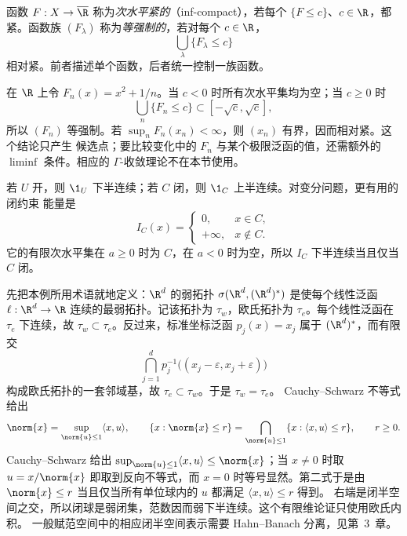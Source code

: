 \begin{definition}[次水平紧与等强制]\label{def:1-2-3-3}
函数 \(F:X\to\overline\R\) 称为\emph{次水平紧的}（inf-compact），若每个
\(\{F\le c\}\)、\(c\in\R\)，都紧。函数族 \((F_\lambda)\) 称为\emph{等强制的}，若对每个 \(c\in\R\)，
\[
 \bigcup_\lambda\{F_\lambda\le c\}
\]
相对紧。前者描述单个函数，后者统一控制一族函数。
\end{definition}

\begin{example}[可计算的等强制族]\label{ex:1-2-3-equicoercive}
在 \(\R\) 上令 \(F_n(x)=x^2+1/n\)。当 \(c<0\) 时所有次水平集均为空；当 \(c\ge0\) 时
\[
 \bigcup_n\{F_n\le c\}\subset[-\sqrt c,\sqrt c],
\]
所以 \((F_n)\) 等强制。若 \(\sup_nF_n(x_n)<\infty\)，则 \((x_n)\) 有界，因而相对紧。这个结论只产生
候选点；要比较变化中的 \(F_n\) 与某个极限泛函的值，还需额外的 \(\liminf\) 条件。相应的
\(\Gamma\)-收敛理论不在本节使用。
\end{example}

\begin{example}[开集指标与闭约束]\label{ex:1-2-3-1}
若 \(U\) 开，则 \(\1_U\) 下半连续；若 \(C\) 闭，则 \(\1_C\) 上半连续。对变分问题，更有用的闭约束
能量是
\[
 I_C(x)=
 \begin{cases}
  0,&x\in C,\\
  +\infty,&x\notin C.
 \end{cases}
\]
它的有限次水平集在 \(a\ge0\) 时为 \(C\)，在 \(a<0\) 时为空，所以 \(I_C\) 下半连续当且仅当 \(C\) 闭。
\end{example}

\begin{example}[有限维模型中的弱下半连续性]\label{ex:1-2-3-2}
先把本例所用术语就地定义：\(\R^d\) 的弱拓扑
\(\sigma(\R^d,(\R^d)^*)\) 是使每个线性泛函 \(\ell:\R^d\to\R\) 连续的最弱拓扑。记该拓扑为
\(\tau_w\)，欧氏拓扑为 \(\tau_e\)。每个线性泛函在 \(\tau_e\) 下连续，故
\(\tau_w\subset\tau_e\)。反过来，标准坐标泛函 \(p_j(x)=x_j\) 属于 \((\R^d)^*\)，而有限交
\[
 \bigcap_{j=1}^d p_j^{-1}\bigl((x_j-\varepsilon,x_j+\varepsilon)\bigr)
\]
构成欧氏拓扑的一套邻域基，故 \(\tau_e\subset\tau_w\)。于是 \(\tau_w=\tau_e\)。
Cauchy--Schwarz 不等式给出
\[
  \norm{x}=\sup_{\norm{u}\le1}\langle x,u\rangle,\qquad
  \{x:\norm{x}\le r\}
  =\bigcap_{\norm{u}\le1}\{x:\langle x,u\rangle\le r\},\qquad r\ge0.
\]
Cauchy--Schwarz 给出
\(\sup_{\norm{u}\le1}\langle x,u\rangle\le\norm{x}\)；当 \(x\ne0\) 时取
\(u=x/\norm{x}\) 即取到反向不等式，而 \(x=0\) 时等号显然。第二式于是由
\(\norm{x}\le r\) 当且仅当所有单位球内的 \(u\) 都满足
\(\langle x,u\rangle\le r\) 得到。
右端是闭半空间之交，所以闭球是弱闭集，范数因而弱下半连续。这个有限维论证只使用欧氏内积。
一般赋范空间中的相应闭半空间表示需要 Hahn--Banach 分离，见第~3~章。
\end{example}

